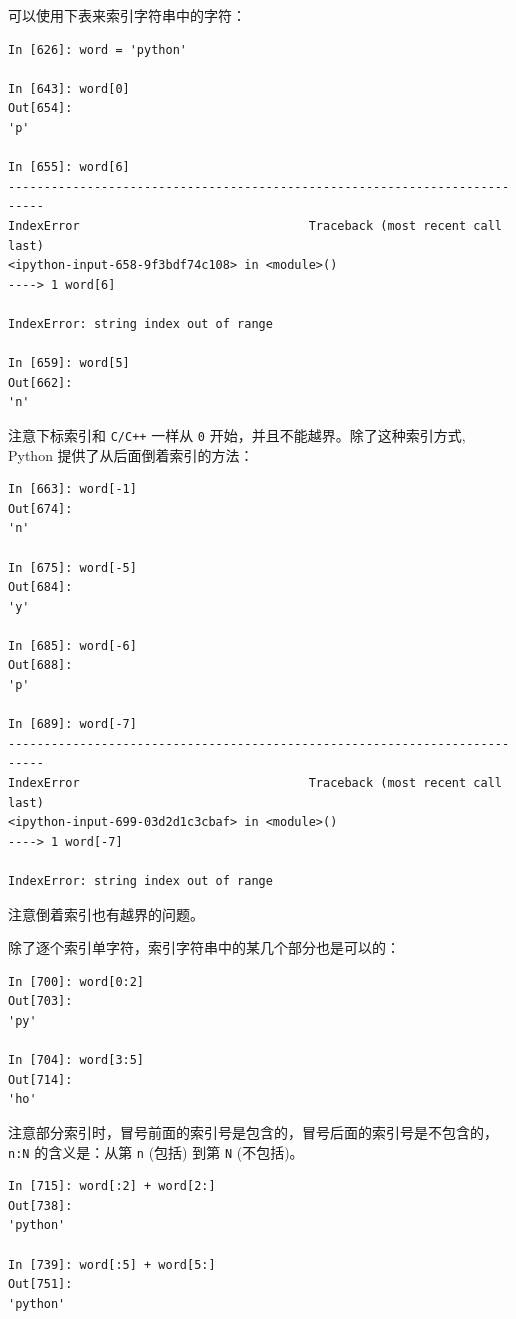 \documentclass[10pt,a4paper,UTF8]{article}
\begin{document}
可以使用下表来索引字符串中的字符：
\lstset{language=Python,label= ,caption= ,captionpos=b,numbers=none}
\begin{lstlisting}
In [626]: word = 'python'

In [643]: word[0]
Out[654]: 
'p'

In [655]: word[6]
---------------------------------------------------------------------------
IndexError                                Traceback (most recent call last)
<ipython-input-658-9f3bdf74c108> in <module>()
----> 1 word[6]

IndexError: string index out of range

In [659]: word[5]
Out[662]: 
'n'
\end{lstlisting}

注意下标索引和 \texttt{C/C++} 一样从 \texttt{0} 开始，并且不能越界。除了这种索引方式, Python 提供了从后面倒着索引的方法：
\lstset{language=Python,label= ,caption= ,captionpos=b,numbers=none}
\begin{lstlisting}
In [663]: word[-1]
Out[674]: 
'n'

In [675]: word[-5]
Out[684]: 
'y'

In [685]: word[-6]
Out[688]: 
'p'

In [689]: word[-7]
---------------------------------------------------------------------------
IndexError                                Traceback (most recent call last)
<ipython-input-699-03d2d1c3cbaf> in <module>()
----> 1 word[-7]

IndexError: string index out of range
\end{lstlisting}

注意倒着索引也有越界的问题。

除了逐个索引单字符，索引字符串中的某几个部分也是可以的：
\lstset{language=Python,label= ,caption= ,captionpos=b,numbers=none}
\begin{lstlisting}
In [700]: word[0:2]
Out[703]: 
'py'

In [704]: word[3:5]
Out[714]: 
'ho'
\end{lstlisting}
注意部分索引时，冒号前面的索引号是包含的，冒号后面的索引号是不包含的， \texttt{n:N} 的含义是：从第 \texttt{n} (包括) 到第 \texttt{N} (不包括)。

\lstset{language=Python,label= ,caption= ,captionpos=b,numbers=none}
\begin{lstlisting}
In [715]: word[:2] + word[2:]
Out[738]: 
'python'

In [739]: word[:5] + word[5:]
Out[751]: 
'python'
\end{lstlisting}
\end{document}
